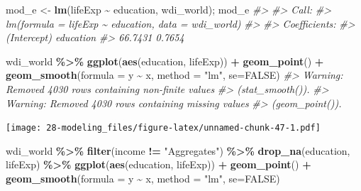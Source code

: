 \documentclass[
  xelatex, ja=standard]{bxjsbook}
\newenvironment{Shaded}{\begin{snugshade}}{\end{snugshade}}
\newcommand{\AttributeTok}[1]{\textcolor[rgb]{0.13,0.29,0.53}{#1}}
\newcommand{\CommentTok}[1]{\textcolor[rgb]{0.56,0.35,0.01}{\textit{#1}}}
\newcommand{\ConstantTok}[1]{\textcolor[rgb]{0.56,0.35,0.01}{#1}}
\newcommand{\FunctionTok}[1]{\textcolor[rgb]{0.13,0.29,0.53}{\textbf{#1}}}
\newcommand{\NormalTok}[1]{#1}
\newcommand{\OtherTok}[1]{\textcolor[rgb]{0.56,0.35,0.01}{#1}}
\newcommand{\SpecialCharTok}[1]{\textcolor[rgb]{0.81,0.36,0.00}{\textbf{#1}}}
\newcommand{\StringTok}[1]{\textcolor[rgb]{0.31,0.60,0.02}{#1}}
\theoremstyle{definition}
\theoremstyle{definition}
\theoremstyle{definition}
\theoremstyle{definition}
\theoremstyle{remark}
\begin{document}
\begin{Shaded}
\begin{Highlighting}[]
\NormalTok{mod\_e }\OtherTok{\textless{}{-}} \FunctionTok{lm}\NormalTok{(lifeExp }\SpecialCharTok{\textasciitilde{}}\NormalTok{ education, wdi\_world); mod\_e}
\CommentTok{\#\textgreater{} }
\CommentTok{\#\textgreater{} Call:}
\CommentTok{\#\textgreater{} lm(formula = lifeExp \textasciitilde{} education, data = wdi\_world)}
\CommentTok{\#\textgreater{} }
\CommentTok{\#\textgreater{} Coefficients:}
\CommentTok{\#\textgreater{} (Intercept)    education  }
\CommentTok{\#\textgreater{}     66.7431       0.7654}
\end{Highlighting}
\end{Shaded}

\begin{Shaded}
\begin{Highlighting}[]
\NormalTok{wdi\_world }\SpecialCharTok{\%\textgreater{}\%} \FunctionTok{ggplot}\NormalTok{(}\FunctionTok{aes}\NormalTok{(education, lifeExp)) }\SpecialCharTok{+} \FunctionTok{geom\_point}\NormalTok{() }\SpecialCharTok{+} \FunctionTok{geom\_smooth}\NormalTok{(}\AttributeTok{formula =}\NormalTok{ y }\SpecialCharTok{\textasciitilde{}}\NormalTok{ x, }\AttributeTok{method =} \StringTok{"lm"}\NormalTok{, }\AttributeTok{se=}\ConstantTok{FALSE}\NormalTok{)}
\CommentTok{\#\textgreater{} Warning: Removed 4030 rows containing non{-}finite values}
\CommentTok{\#\textgreater{} (\textasciigrave{}stat\_smooth()\textasciigrave{}).}
\CommentTok{\#\textgreater{} Warning: Removed 4030 rows containing missing values}
\CommentTok{\#\textgreater{} (\textasciigrave{}geom\_point()\textasciigrave{}).}
\end{Highlighting}
\end{Shaded}

\texttt{[image: 28-modeling\_files/figure-latex/unnamed-chunk-47-1.pdf]}

\begin{Shaded}
\begin{Highlighting}[]
\NormalTok{wdi\_world }\SpecialCharTok{\%\textgreater{}\%} \FunctionTok{filter}\NormalTok{(income }\SpecialCharTok{!=} \StringTok{"Aggregates"}\NormalTok{) }\SpecialCharTok{\%\textgreater{}\%} \FunctionTok{drop\_na}\NormalTok{(education, lifeExp) }\SpecialCharTok{\%\textgreater{}\%} \FunctionTok{ggplot}\NormalTok{(}\FunctionTok{aes}\NormalTok{(education, lifeExp)) }\SpecialCharTok{+} \FunctionTok{geom\_point}\NormalTok{() }\SpecialCharTok{+} \FunctionTok{geom\_smooth}\NormalTok{(}\AttributeTok{formula =}\NormalTok{ y }\SpecialCharTok{\textasciitilde{}}\NormalTok{ x, }\AttributeTok{method =} \StringTok{"lm"}\NormalTok{, }\AttributeTok{se=}\ConstantTok{FALSE}\NormalTok{)}
\end{Highlighting}
\end{Shaded}
\end{document}
